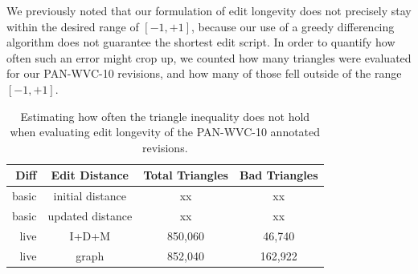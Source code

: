 We previously noted that our formulation of edit longevity does
not precisely stay within the desired range of $[-1,+1]$,
because our use of a greedy differencing algorithm does not
guarantee the shortest edit script.
In order to quantify how often such an error might crop up,
we counted how many triangles were evaluated for our PAN-WVC-10
revisions, and how many of those fell outside of the range $[-1,+1]$.

\begin{table}[htbp]
\begin{center}
\begin{tabular}{|r|c|c|c|}
\hline
Diff & Edit Distance & Total Triangles & Bad Triangles \\
\hline
\hline
basic & initial distance & xx & xx \\
basic & updated distance & xx & xx \\
live & I+D+M & 850,060 & 46,740 \\
live & graph & 852,040 & 162,922 \\
\hline
\end{tabular}
\end{center}
\caption{Estimating how often the triangle inequality does
    not hold when evaluating edit longevity of the
    PAN-WVC-10 annotated revisions.
} 
\label{tbl:badtriangles}
\end{table}



